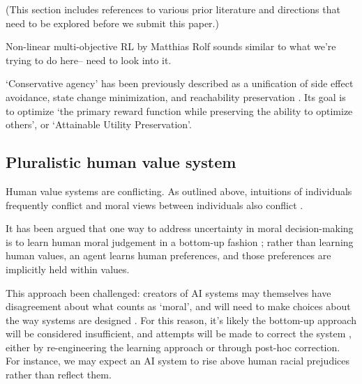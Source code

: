 (This section includes references to various prior literature and directions that need to be explored before we submit this paper.)

Non-linear multi-objective RL by Matthias Rolf\cite{rolf_need_2020} sounds similar to what we're trying to do here-- need to look into it.

`Conservative agency' has been previously described as a unification of side effect avoidance, state change minimization, and reachability preservation \cite{armstrong_low_2017, turner_conservative_2020}. Its goal is to optimize `the primary reward function while preserving the ability to optimize others', or `Attainable Utility Preservation'.





\subsection{Pluralistic human value system}

Human value systems are conflicting. As outlined above, intuitions of individuals frequently conflict \cite{haidt2001emotional} and moral views between individuals also conflict \cite{bogosian_implementation_2017}. 

It has been argued that one way to address uncertainty in moral decision-making is to learn human moral judgement in a bottom-up fashion \cite{bogosian_implementation_2017}; rather than learning human values, an agent learns human preferences, and those preferences are implicitly held within values. 

This approach been challenged: creators of AI systems may themselves have disagreement about what counts as `moral', and will need to make choices about the way systems are designed  \cite{bogosian_implementation_2017}. For this reason, it's likely the bottom-up approach will be considered insufficient, and attempts will be made to correct the system \cite{stray2020you}, either by re-engineering the learning approach or through post-hoc correction. For instance, we may expect an AI system to rise above human racial prejudices rather than reflect them. 

